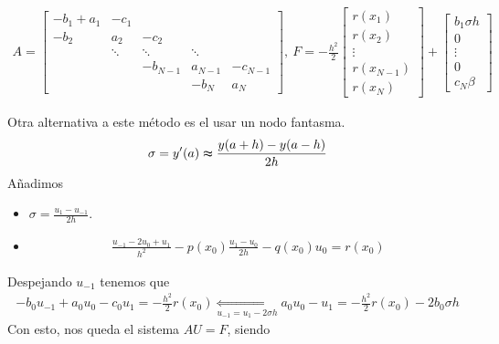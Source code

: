 \begin{align*}
    A = \begin{bmatrix}
            -b_1 +a_1 & -c_1   &          &         &          \\
            -b_2      & a_2    & -c_2     &         &          \\
                      & \ddots & \ddots   & \ddots  &          \\
                      &        & -b_{N-1} & a_{N-1} & -c_{N-1} \\
                      &        &          & -b_N    & a_N
        \end{bmatrix}, \ F = -\frac{h^2}{2} \begin{bmatrix}
                                                r(x_1)     \\
                                                r(x_2)     \\
                                                \vdots     \\
                                                r(x_{N-1}) \\
                                                r(x_N)
                                            \end{bmatrix} + \begin{bmatrix}
                                                                b_1 \sigma h \\
                                                                0            \\
                                                                \vdots       \\
                                                                0            \\
                                                                c_N\beta
                                                            \end{bmatrix}
\end{align*}

Otra alternativa a este método es el usar un nodo fantasma.
\begin{align*}
    \sigma = y'(a) \thickapprox \frac{y(a+h) -y(a-h)}{2h}
\end{align*}
Añadimos
\begin{itemize}
    \item $\sigma = \frac{u_1 -u_{-1}}{2h}$.
    \item
          \begin{align*}
              \frac{u_{-1} -2u_0 +u_1}{h^2} - p(x_0)\frac{u_1 -u_0}{2h} -q(x_0)u_0 = r(x_0)
          \end{align*}
\end{itemize}
Despejando $u_{-1}$ tenemos que
\begin{align*}
    -b_0u_{-1} +a_0u_0 -c_0u_1 = -\frac{h^2}{2}r(x_0) \underset{u_{-1} = u_1 - 2\sigma h}{\Longleftrightarrow} a_0u_0 -u_1 = -\frac{h^2}{2}r(x_0) -2b_0\sigma h
\end{align*}
Con esto, nos queda el sistema $AU = F$, siendo

